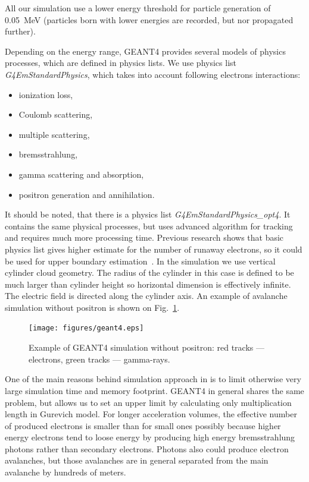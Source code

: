 \documentclass[doublecol,linenumbers]{epl2} %
\begin{document}
All our simulation use a lower energy threshold for particle generation of 0.05~MeV (particles born with lower energies are recorded, but nor propagated further).

Depending on the energy range, GEANT4 provides several models of physics processes, which are defined in physics lists. We use physics list \textit{G4EmStandardPhysics}, which takes into account following electrons interactions:

\begin{itemize}
    \item ionization loss,
    \item Coulomb scattering,
    \item multiple scattering,
    \item bremsstrahlung,
    \item gamma scattering and absorption,
    \item positron generation and annihilation.
\end{itemize}
It should be noted, that there is a physics list \textit{G4EmStandardPhysics\_opt4}. It contains the same physical processes, but uses advanced algorithm for tracking and requires much more processing time. Previous research shows that basic physics list gives higher estimate for the number of runaway electrons, so it could be used for upper boundary estimation~\cite{npmdwyer}.
In the simulation we use  vertical cylinder cloud geometry. The radius of the cylinder in this case is defined to be much larger than cylinder height so horizontal dimension is effectively infinite. The electric field is directed along the cylinder axis. An example of avalanche simulation without positron is shown on Fig.~\ref{fig:geant4}.
\begin{figure}[h]
    \centering
    \texttt{[image: figures/geant4.eps]}
    \caption{Example of GEANT4 simulation without positron: red tracks --- electrons, green tracks --- gamma-rays.}
    \label{fig:geant4}
\end{figure}
One of the main reasons behind simulation approach in \cite{Oreshkin_2018} is to limit otherwise very large simulation time and memory footprint. GEANT4 in general shares the same problem, but allows us to set an upper limit by calculating only multiplication length in Gurevich model. For longer acceleration volumes, the effective number of produced electrons is smaller than for small ones possibly because higher energy electrons tend to loose energy by producing high energy bremsstrahlung photons rather than secondary electrons. Photons also could produce electron avalanches, but those avalanches are in general separated from the main avalanche by hundreds of meters.
\end{document}
